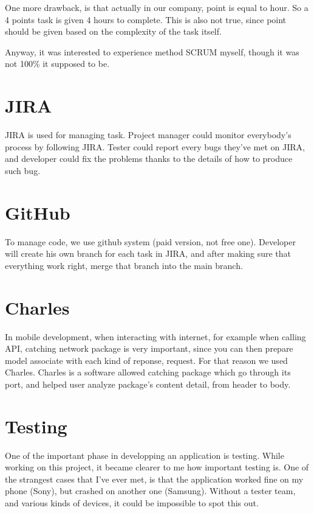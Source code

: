 One more drawback, is that actually in our company, point is equal to hour. So a 4 points task is given 4 hours to complete. This is also not true, since point should be given based on the complexity of the task itself. 

Anyway, it was interested to experience method SCRUM myself, though it was not 100\% it supposed to be. 

\section{JIRA}

JIRA is used for managing task. Project manager could monitor everybody's process by following JIRA. Tester could report every bugs they've met on JIRA, and developer could fix the problems thanks to the details of how to produce such bug. 

\section{GitHub}

To manage code, we use github system (paid version, not free one). Developer will create his own branch for each task in JIRA, and after making sure that everything work right, merge that branch into the main branch. 

\section{Charles}

In mobile development, when interacting with internet, for example when calling API, catching network package is very important, since you can then prepare model associate with each kind of reponse, request. For that reason we used Charles. Charles is a software allowed catching package which go through its port, and helped user analyze package's content detail, from header to body.

\section{Testing}

One of the important phase in developping an application is testing. While working on this project, it became clearer to me how important testing is. One of the strangest cases that I've ever met, is that the application worked fine on my phone (Sony), but crashed on another one (Samsung). Without a tester team, and various kinds of devices, it could be impossible to spot this out. 
